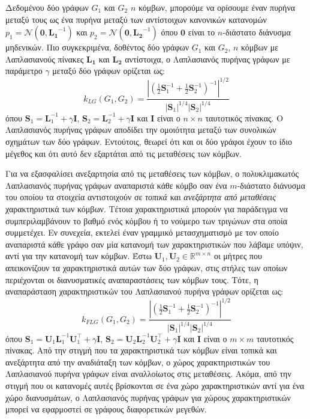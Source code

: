 Δεδομένου δύο γράφων $G_1$ και $G_2$ $n$ κόμβων, μπορούμε να ορίσουμε έναν πυρήνα μεταξύ τους ως ένα πυρήνα μεταξύ των αντίστοιχων κανονικών κατανομών $p_1 = \mathcal{N}(\mathbf{0}, \mathbf{L_1}^{-1})$ και $p_2 = \mathcal{N}(\mathbf{0}, \mathbf{L_2}^{-1})$ όπου $\mathbf{0}$ είναι το $n$-διάστατο διάνυσμα μηδενικών.
Πιο συγκεκριμένα, δοθέντος δύο γράφων $G_1$ και $G_2$, $n$ κόμβων με Λαπλασιανούς πίνακες $\mathbf{L_1}$ και $\mathbf{L_2}$ αντίστοιχα, ο Λαπλασιανός πυρήνας γράφων με παράμετρο $\gamma$ μεταξύ δύο γράφων ορίζεται ως:
\begin{equation}
    k_{LG}(G_1, G_2) = \frac{| (\frac{1}{2} \mathbf{S}_1^{-1} + \frac{1}{2} \mathbf{S}_2^{-1} )^{-1} |^{1/2}}{|\mathbf{S}_1|^{1/4} |\mathbf{S}_2|^{1/4}} 
\end{equation}όπου $\mathbf{S}_1 = \mathbf{L}_1^{-1} + \gamma \mathbf{I}$, $\mathbf{S}_2 = \mathbf{L}_2^{-1} + \gamma \mathbf{I}$ και $\mathbf{I}$ είναι ο $n \times n$ ταυτοτικός πίνακας.
Ο Λαπλασιανός πυρήνας γράφων αποδίδει την ομοιότητα μεταξύ των συνολικών σχημάτων των δύο γράφων.
Εντούτοις, θεωρεί ότι και οι δύο γράφοι έχουν το ίδιο μέγεθος και ότι αυτό δεν εξαρτάται από τις μεταθέσεις των κόμβων.\par
Για να εξασφαλίσει ανεξαρτησία από τις μεταθέσεις των κόμβων, ο πολυκλιμακωτός Λαπλασιανός πυρήνας γράφων αναπαριστά κάθε κόμβο σαν ένα $m$-διάστατο διάνυσμα του οποίου τα στοιχεία αντιστοιχούν σε \textit{τοπικά} και \textit{ανεξάρτητα από μεταθέσεις} χαρακτηριστικά των κόμβων.
Τέτοια χαρακτηριστικά μπορούν για παράδειγμα να συμπεριλαμβάνουν το βαθμό ενός κόμβου ή το νούμερο των τριγώνων στα οποία συμμετέχει.
Εν συνεχεία, εκτελεί έναν γραμμικό μετασχηματισμό με τον οποίο αναπαριστά κάθε γράφο σαν μία κατανομή των χαρακτηριστικών που λάβαμε υπόψιν, αντί για την κατανομή των κόμβων.
Έστω $\mathbf{U}_1, \mathbf{U}_2 \in \mathbb{R}^{m \times n}$ οι μήτρες που απεικονίζουν τα χαρακτηριστικά αυτών των δύο γράφων, στις στήλες των οποίων περιέχονται οι διανυσματικές αναπαραστάσεις των κόμβων τους.
Τότε, η αναπαράσταση χαρακτηριστικών του Λαπλασιανού πυρήνα γράφων ορίζεται ως:
\begin{equation}
    k_{FLG}(G_1, G_2) = \frac{| (\frac{1}{2} \mathbf{S}_1^{-1} + \frac{1}{2} \mathbf{S}_2^{-1} )^{-1} |^{1/2}}{|\mathbf{S}_1|^{1/4} |\mathbf{S}_2|^{1/4}} 
\end{equation}
όπου $\mathbf{S}_1 = \mathbf{U}_1 \mathbf{L}_1^{-1} \mathbf{U}_1^\top + \gamma \mathbf{I}$, $\mathbf{S}_2 = \mathbf{U}_2 \mathbf{L}_2^{-1} \mathbf{U}_2^\top + \gamma \mathbf{I}$ και $\mathbf{I}$ είναι ο $m \times m$ ταυτοτικός πίνακας.
Από την στιγμή που τα χαρακτηριστικά των κόμβων είναι τοπικά και ανεξάρτητα από την αναδιάταξη των κόμβων, ο χώρος χαρακτηριστικών του Λαπλασιανού πυρήνα γράφων είναι αναλλοίωτος στις μεταθέσεις.
Ακόμα, από την στιγμή που οι κατανομές αυτές βρίσκονται σε ένα χώρο χαρακτηριστικών αντί για ένα χώρο διανυσμάτων, ο Λαπλασιανός πυρήνας γράφων για χώρους χαρακτηριστικών μπορεί να εφαρμοστεί σε γράφους διαφορετικών μεγεθών.


